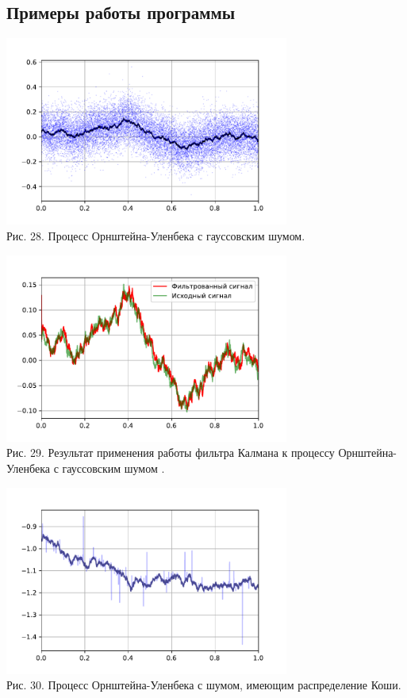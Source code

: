 \documentclass[11pt]{article}
\begin{document}
\subsection{Примеры работы программы}
\begin{center}
	\includegraphics[width=0.7\textwidth]{10_1.pdf}\\
	{Рис. 28. Процесс Орнштейна-Уленбека с гауссовским шумом. }
\end{center}
\begin{center}
	\includegraphics[width=0.7\textwidth]{10_2.pdf}\\
	{Рис. 29. Результат применения работы фильтра Калмана к процессу Орнштейна-Уленбека с гауссовским шумом . }
\end{center}
\begin{center}
	\includegraphics[width=0.7\textwidth]{10_3.pdf}\\
	{Рис. 30. Процесс Орнштейна-Уленбека с шумом, имеющим распределение Коши. }
\end{center}
\end{document}
